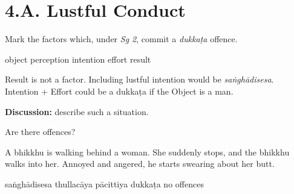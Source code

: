 \chapter{4.A. Lustful Conduct}
\renewcommand*{\theChapterTitle}{4.A. Lustful Conduct}

\begin{exam}{\autoExamName}

\begin{problem*}

  \begin{parts}

  \item Mark the factors which, under \textit{Sg 2}, commit a \textit{dukkaṭa} offence.

    \bigskip

    \begin{answers}{6}
      \bChoices
       object\eAns
       perception\eAns
       intention\eAns
       effort\eAns
       result\eAns
      \eChoices
    \end{answers}

    \bigskip

    \begin{solution}
      Result is not a factor.
      Including lustful intention would be \emph{saṅghādisesa}.
      Intention + Effort could be a dukkaṭa if the Object is a man.
    \end{solution}

    \textbf{Discussion:} describe such a situation.

  \end{parts}

\end{problem*}

\problemDivide

\begin{problem*}

  Are there offences?

  \begin{parts}

  \item
    A bhikkhu is walking behind a woman. She suddenly stops, and the bhikkhu walks
    into her. Annoyed and angered, he starts swearing about her butt.

    \bigskip

    \begin{answers}{5}
      \bChoices
       saṅghādisesa\eAns
       thullacāya\eAns
       pācittiya\eAns
       dukkaṭa\eAns
       no offences\eAns
      \eChoices
    \end{answers}


\end{parts}
\end{problem*}
\end{exam}
